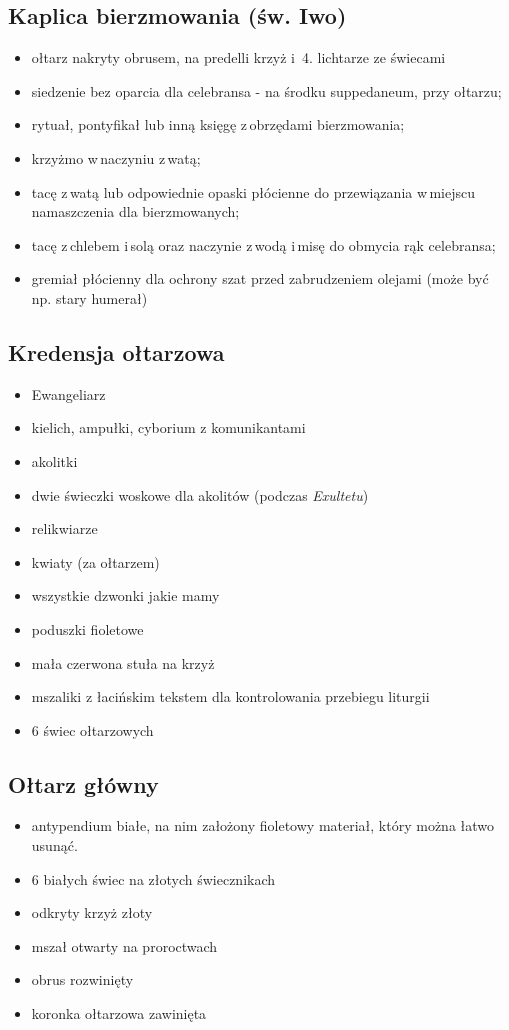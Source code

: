\subsection{Kaplica bierzmowania (św. Iwo)}
\begin{itemize}
	\item ołtarz nakryty obrusem, na predelli krzyż i  4. lichtarze ze świecami
	\item siedzenie bez oparcia dla celebransa - na środku suppedaneum, przy
	      ołtarzu;
	\item rytuał, pontyfikał lub inną księgę z obrzędami bierzmowania;
	\item krzyżmo w naczyniu z watą;
	\item tacę z watą lub odpowiednie opaski płócienne do przewiązania w miejscu
	      namaszczenia dla bierzmowanych;
	\item tacę z chlebem i solą oraz naczynie z wodą i misę do obmycia rąk
	      celebransa;
	\item gremiał płócienny dla ochrony szat przed zabrudzeniem olejami (może
	      być np. stary humerał)
\end{itemize}

\subsection{Kredensja ołtarzowa}
\begin{itemize}
	\item Ewangeliarz
	\item kielich, ampułki, cyborium z komunikantami
	\item akolitki
	\item dwie świeczki woskowe dla akolitów (podczas \textit{Exultetu})
	\item relikwiarze
	\item kwiaty (za ołtarzem)
	\item wszystkie dzwonki jakie mamy
	\item poduszki fioletowe
	\item mała czerwona stuła na krzyż
	\item mszaliki z łacińskim tekstem dla kontrolowania przebiegu liturgii
	\item 6 świec ołtarzowych
\end{itemize}

\subsection{Ołtarz główny}
\begin{itemize}
	\item antypendium białe, na nim założony {\color{violet}fioletowy} materiał,
	      który można łatwo usunąć.
	\item 6 białych świec na złotych świecznikach
	\item odkryty krzyż złoty
	\item mszał otwarty na proroctwach
	\item obrus rozwinięty
	\item koronka ołtarzowa zawinięta
\end{itemize}

